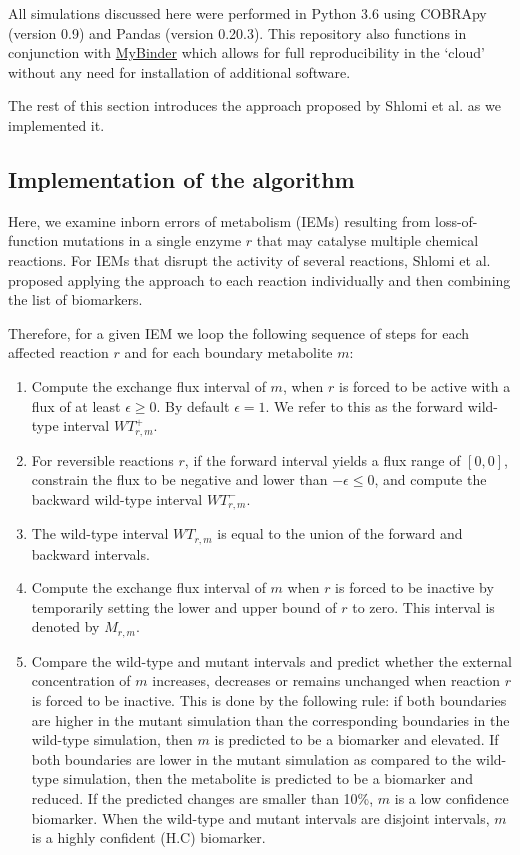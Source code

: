 \documentclass[10pt,a4paper,onecolumn]{article}
\newcommand{\tightlist}{%
  \setlength{\itemsep}{1pt}\setlength{\parskip}{0pt}\setlength{\parsep}{0pt}}
\begin{document}
All simulations discussed here were performed in Python 3.6 using
COBRApy \autocite{Ebrahim2013} (version 0.9) and Pandas (version
0.20.3). This repository also functions in conjunction with
\href{http://mybinder.org}{MyBinder} which allows for full
reproducibility in the `cloud' without any need for installation of
additional software.

The rest of this section introduces the approach proposed by Shlomi et
al. as we implemented it.

\subsection{Implementation of the
algorithm}\label{implementation-of-the-algorithm}

Here, we examine inborn errors of metabolism (IEMs) resulting from
loss-of-function mutations in a single enzyme \(r\) that may catalyse
multiple chemical reactions. For IEMs that disrupt the activity of
several reactions, Shlomi et al. proposed applying the approach to each
reaction individually and then combining the list of biomarkers.

Therefore, for a given IEM we loop the following sequence of steps for
each affected reaction \(r\) and for each boundary metabolite \(m\):

\begin{enumerate}
\def\labelenumi{\arabic{enumi}.}
\tightlist
\item
  Compute the exchange flux interval of \(m\), when \(r\) is forced to
  be active with a flux of at least \(\epsilon \geq 0\). By default
  \(\epsilon = 1\). We refer to this as the forward wild-type interval
  \(WT_{r,m}^+\).
\item
  For reversible reactions \(r\), if the forward interval yields a flux
  range of \([0,0]\), constrain the flux to be negative and lower than
  \(-\epsilon \leq 0\), and compute the backward wild-type interval
  \(WT_{r,m}^-\).
\item
  The wild-type interval \(WT_{r,m}\) is equal to the union of the
  forward and backward intervals.
\item
  Compute the exchange flux interval of \(m\) when \(r\) is forced to be
  inactive by temporarily setting the lower and upper bound of \(r\) to
  zero. This interval is denoted by \(M_{r,m}\).
\item
  Compare the wild-type and mutant intervals and predict whether the
  external concentration of \(m\) increases, decreases or remains
  unchanged when reaction \(r\) is forced to be inactive. This is done
  by the following rule: if both boundaries are higher in the mutant
  simulation than the corresponding boundaries in the wild-type
  simulation, then \(m\) is predicted to be a biomarker and elevated. If
  both boundaries are lower in the mutant simulation as compared to the
  wild-type simulation, then the metabolite is predicted to be a
  biomarker and reduced. If the predicted changes are smaller than 10\%,
  \(m\) is a low confidence biomarker. When the wild-type and mutant
  intervals are disjoint intervals, \(m\) is a highly confident (H.C)
  biomarker.
\end{enumerate}
\end{document}

